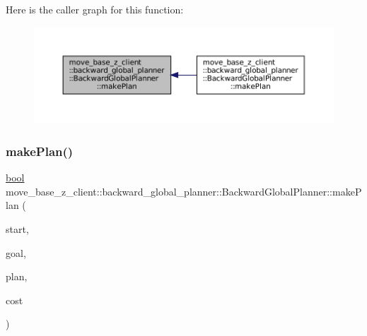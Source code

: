 Here is the caller graph for this function\+:
\nopagebreak
\begin{figure}[H]
\begin{center}
\leavevmode
\includegraphics[width=350pt]{classmove__base__z__client_1_1backward__global__planner_1_1BackwardGlobalPlanner_af9441c1bd8d258281458ca7fa012e0e6_icgraph}
\end{center}
\end{figure}
\mbox{\label{classmove__base__z__client_1_1backward__global__planner_1_1BackwardGlobalPlanner_a8fa9df4146c5ee1d4b597e49466016e0}} 
\subsubsection{\texorpdfstring{make\+Plan()}{makePlan()}\hspace{0.1cm}{\footnotesize\ttfamily [2/2]}}
{\footnotesize\ttfamily \hyperlink{classbool}{bool} move\+\_\+base\+\_\+z\+\_\+client\+::backward\+\_\+global\+\_\+planner\+::\+Backward\+Global\+Planner\+::make\+Plan (\begin{DoxyParamCaption}\item[{const geometry\+\_\+msgs\+::\+Pose\+Stamped \&}]{start,  }\item[{const geometry\+\_\+msgs\+::\+Pose\+Stamped \&}]{goal,  }\item[{std\+::vector$<$ geometry\+\_\+msgs\+::\+Pose\+Stamped $>$ \&}]{plan,  }\item[{double \&}]{cost }\end{DoxyParamCaption})}

